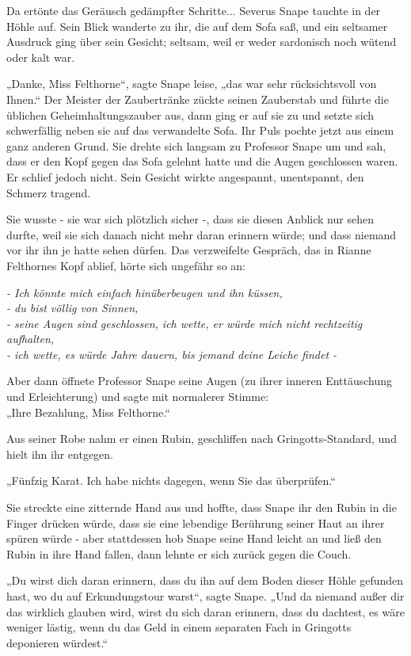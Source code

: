 {Da ertönte das Geräusch gedämpfter Schritte... Severus Snape tauchte in der Höhle auf. Sein Blick wanderte zu ihr, die auf dem Sofa saß, und ein seltsamer Ausdruck ging über sein Gesicht; seltsam, weil er weder sardonisch noch wütend oder kalt war.

„Danke, Miss Felthorne“, sagte Snape leise, „das war sehr rücksichtsvoll von Ihnen.“ Der Meister der Zaubertränke zückte seinen Zauberstab und führte die üblichen Geheimhaltungszauber aus, dann ging er auf sie zu und setzte sich schwerfällig neben sie auf das verwandelte Sofa. Ihr Puls pochte jetzt aus einem ganz anderen Grund. Sie drehte sich langsam zu Professor Snape um und sah, dass er den Kopf gegen das Sofa gelehnt hatte und die Augen geschlossen waren. Er schlief jedoch nicht. Sein Gesicht wirkte angespannt, unentspannt, den Schmerz tragend.

Sie wusste - sie war sich plötzlich sicher -, dass sie diesen Anblick nur sehen durfte, weil sie sich danach nicht mehr daran erinnern würde; und dass niemand vor ihr ihn je hatte sehen dürfen. Das verzweifelte Gespräch, das in Rianne Felthornes Kopf ablief, hörte sich ungefähr so an:

\emph{- Ich könnte mich einfach hinüberbeugen und ihn küssen,}\\ \emph{- du bist völlig von Sinnen,}\\ \emph{- seine Augen sind geschlossen, ich wette, er würde mich nicht rechtzeitig aufhalten,\\ - ich wette, es würde Jahre dauern, bis jemand deine Leiche findet -}

Aber dann öffnete Professor Snape seine Augen (zu ihrer inneren Enttäuschung und Erleichterung) und sagte mit normalerer Stimme:\\ „Ihre Bezahlung, Miss Felthorne.“

Aus seiner Robe nahm er einen Rubin, geschliffen nach Gringotts-Standard, und hielt ihn ihr entgegen.

„Fünfzig Karat. Ich habe nichts dagegen, wenn Sie das überprüfen.“

Sie streckte eine zitternde Hand aus und hoffte, dass Snape ihr den Rubin in die Finger drücken würde, dass sie eine lebendige Berührung seiner Haut an ihrer spüren würde - aber stattdessen hob Snape seine Hand leicht an und ließ den Rubin in ihre Hand fallen, dann lehnte er sich zurück gegen die Couch.

„Du wirst dich daran erinnern, dass du ihn auf dem Boden dieser Höhle gefunden hast, wo du auf Erkundungstour warst“, sagte Snape. „Und da niemand außer dir das wirklich glauben wird, wirst du sich daran erinnern, dass du dachtest, es wäre weniger lästig, wenn du das Geld in einem separaten Fach in Gringotts deponieren würdest.“

}
